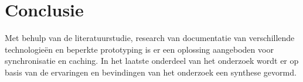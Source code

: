 \section{Conclusie}
Met behulp van de literatuurstudie, research van documentatie van verschillende technologie\"en en beperkte prototyping is er een oplossing aangeboden voor synchronisatie en caching. In het laatste onderdeel van het onderzoek wordt er op basis van de ervaringen en bevindingen van het onderzoek een synthese gevormd.